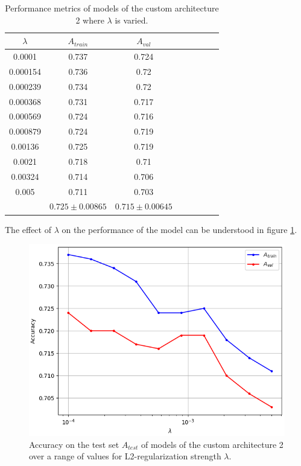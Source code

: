 \begin{table}[ht]
\centering
\begin{tabular}{ |c|c|c|c|c|c|c|c| }
\hline
$\lambda$ & $A_{train}$ & $A_{val}$ \\
\hline
0.0001 & 0.737 & 0.724 \\
0.000154 & 0.736 & 0.72 \\
0.000239 & 0.734 & 0.72 \\
0.000368 & 0.731 & 0.717 \\
0.000569 & 0.724 & 0.716 \\
0.000879 & 0.724 & 0.719 \\
0.00136 & 0.725 & 0.719 \\
0.0021 & 0.718 & 0.71 \\
0.00324 & 0.714 & 0.706 \\
0.005 & 0.711 & 0.703 \\
\hline
 & $0.725\pm0.00865$ & $0.715\pm0.00645$ \\
\hline
\end{tabular}
\caption{Performance metrics of models of the custom architecture 2 where $\lambda$ is varied.}
\label{table:custom2_all}
\end{table}

The effect of $\lambda$ on the performance of the model can be understood in figure \ref{fig:custom2_lambda}.

\begin{figure}[ht]
    \centering
    \includegraphics[width=1.0\textwidth]{figs/custom2_lambda.png}
    \caption{Accuracy on the test set $A_{test}$ of models of the custom architecture 2 over a range of values for L2-regularization strength $\lambda$.}
    \label{fig:custom2_lambda}
\end{figure}


